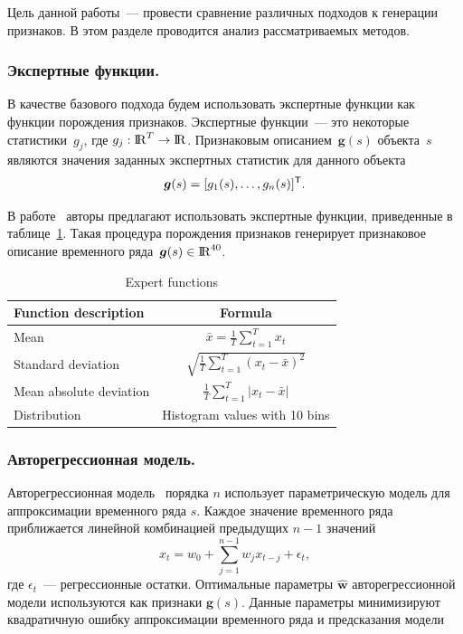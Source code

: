 \documentclass{llncs}
\newcommand{\T}{{\mbox{\scriptsize\sffamily\upshape\mdseries T}}}
\begin{document}
Цель данной работы~--- провести сравнение различных подходов к генерации признаков.
В этом разделе проводится анализ рассматриваемых методов.

\subsubsection{Экспертные функции.}
В качестве базового подхода будем использовать экспертные функции как функции порождения признаков.
Экспертные функции~--- это некоторые статистики~$g_j$, где $g_j: {\rm I\!R}^T \rightarrow {\rm I\!R}$.
Признаковым описанием~$\bm{g}(s)$ объекта~$s$ являются значения заданных экспертных статистик для данного объекта
\[
\bm{g}(s) = [g_1(s), \dots, g_n(s)]^{\T}.
\]

В работе~\cite{kwapisz2011activity} авторы предлагают использовать экспертные функции, приведенные в таблице~\ref{tbl::expert_functions}.
Такая процедура порождения признаков генерирует признаковое описание временного ряда~$\bm{g}(s) \in {\rm I\!R}^{40}$.

\begin{table}[h]
	\centering
	\caption{Expert functions}
	\begin{tabular}{|l|c|}
		\hline
		\textbf{Function description}    & \textbf{Formula} \\ \hline
		Mean                    & $\bar{x} = \frac{1}{T} \sum_{t=1}^{T} x_t$    \\ \hline
		Standard deviation      & $\sqrt{\frac{1}{T} \sum_{t=1}^{T} (x_t - \bar{x})^2}$    \\ \hline
		Mean absolute deviation & $\frac{1}{T} \sum_{t=1}^{T} |x_t - \bar{x}|$    \\ \hline
		Distribution            &  Histogram values with 10 bins    \\ \hline
	\end{tabular}
	\label{tbl::expert_functions}
\end{table}

\subsubsection{Авторегрессионная модель.}
Авторегрессионная модель~\cite{lukashin2003adaptive} порядка $n$
использует параметрическую модель для аппроксимации временного ряда $s$. 
Каждое значение временного ряда приближается линейной комбинацией предыдущих $n-1$ значений
\begin{equation*}
x_t = w_0 + \sum_{j=1}^{n-1} w_j x_{t-j} + \epsilon_t,
\end{equation*}
где $\epsilon_t$~--- регрессионные остатки.
Оптимальные параметры $\hat{\bm{w}}$ авторегрессионной модели используются как признаки $\bm{g}(s)$.
Данные параметры минимизируют квадратичную ошибку аппроксимации временного ряда и предсказания модели
\end{document}

